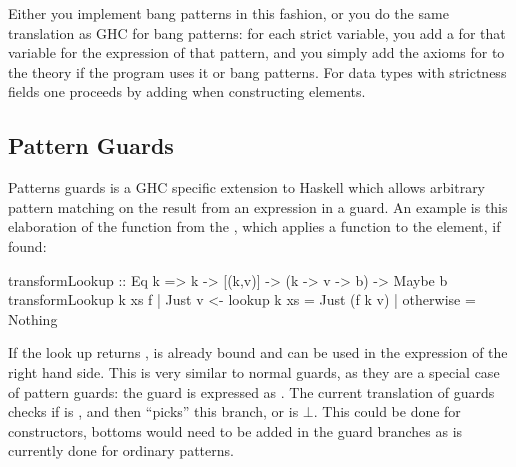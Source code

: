 Either you implement bang patterns in this fashion, or you do the same
translation as GHC for bang patterns: for each strict variable, you
add a  for that variable for the expression of that pattern,
and you simply add the axioms for  to the theory if the
program uses it or bang patterns. For data types with strictness
fields one proceeds by adding  when constructing elements.

\subsection{Pattern Guards}

Patterns guards is a GHC specific extension to Haskell which allows
arbitrary pattern matching on the result from an expression in a
guard. An example is this elaboration of the  function from
the , which applies a function to the element, if found:

\begin{code}
transformLookup :: Eq k => k -> [(k,v)] -> (k -> v -> b) -> Maybe b
transformLookup k xs f | Just v <- lookup k xs = Just (f k v)
                       | otherwise             = Nothing
\end{code}

\noindent
If the look up returns ,  is already bound and can be
used in the expression of the right hand side. This is very similar to
normal guards, as they are a special case of pattern guards: the guard
 is expressed as . The current
translation of guards checks if  is , and then
``picks'' this branch, or is $\bot$. This could be done for
constructors, bottoms would need to be added in the guard branches as
is currently done for ordinary patterns.

